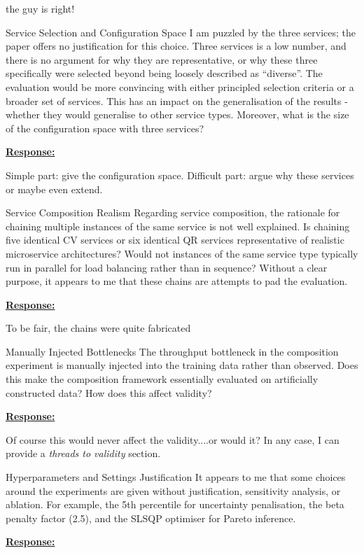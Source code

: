 \documentclass{article}
\newcommand{\Response}[1][]{%
    \noindent\underline{\textbf{Response:}}\par\vspace{0.2cm}%
    #1\par\vspace{0.6cm}%
}
\begin{document}
the guy is right!

\begin{cmt}{Service Selection and Configuration Space}{}
I am puzzled by the three services; the paper offers no justification for this choice. Three services is a low number, and there is no argument for why they are representative, or why these three specifically were selected beyond being loosely described as ``diverse''. The evaluation would be more convincing with either principled selection criteria or a broader set of services. This has an impact on the generalisation of the results - whether they would generalise to other service types. Moreover, what is the size of the configuration space with three services?
\end{cmt}
\Response

Simple part: give the configuration space. Difficult part: argue why these services or maybe even extend.

\begin{cmt}{Service Composition Realism}{}
Regarding service composition, the rationale for chaining multiple instances of the same service is not well explained. Is chaining five identical CV services or six identical QR services representative of realistic microservice architectures? Would not instances of the same service type typically run in parallel for load balancing rather than in sequence? Without a clear purpose, it appears to me that these chains are attempts to pad the evaluation.
\end{cmt}
\Response

To be fair, the chains were quite fabricated

\begin{cmt}{Manually Injected Bottlenecks}{}
The throughput bottleneck in the composition experiment is manually injected into the training data rather than observed. Does this make the composition framework essentially evaluated on artificially constructed data? How does this affect validity?
\end{cmt}
\Response

Of course this would never affect the validity....or would it? In any case, I can provide a \textit{threads to validity} section.

\begin{cmt}{Hyperparameters and Settings Justification}{}
It appears to me that some choices around the experiments are given without justification, sensitivity analysis, or ablation. For example, the 5th percentile for uncertainty penalisation, the beta penalty factor (2.5), and the SLSQP optimiser for Pareto inference.
\end{cmt}
\Response
\end{document}
